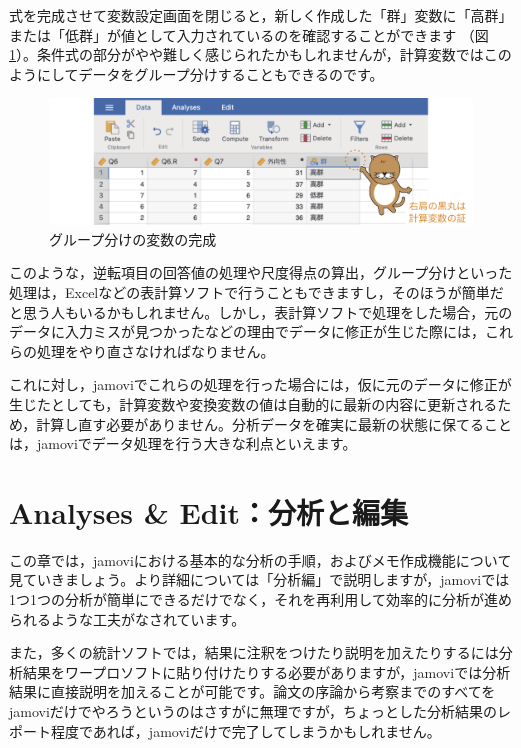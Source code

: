\documentclass[
  12pt,
  a5jpaper,
  lualatex, ja=standard]{bxjsbook}
\begin{document}
式を完成させて変数設定画面を閉じると，新しく作成した「群」変数に「高群」または「低群」が値として入力されているのを確認することができます
（図\ref{fig:basics-exercise-group-var}）。条件式の部分がやや難しく感じられたかもしれませんが，計算変数ではこのようにしてデータをグループ分けすることもできるのです。

\begin{figure}[!ht]

{\centering \includegraphics[width=1\linewidth]{images/basics/exercise-group-var} 

}

\caption{グループ分けの変数の完成}\label{fig:basics-exercise-group-var}
\end{figure}

このような，逆転項目の回答値の処理や尺度得点の算出，グループ分けといった処理は，Excelなどの表計算ソフトで行うこともできますし，そのほうが簡単だと思う人もいるかもしれません。しかし，表計算ソフトで処理をした場合，元のデータに入力ミスが見つかったなどの理由でデータに修正が生じた際には，これらの処理をやり直さなければなりません。

これに対し，jamoviでこれらの処理を行った場合には，仮に元のデータに修正が生じたとしても，計算変数や変換変数の値は自動的に最新の内容に更新されるため，計算し直す必要がありません。分析データを確実に最新の状態に保てることは，jamoviでデータ処理を行う大きな利点といえます。

\hypertarget{ch:basics-more}{%
\chapter{Analyses \& Edit：分析と編集}\label{ch:basics-more}}

この章では，jamoviにおける基本的な分析の手順，およびメモ作成機能について見ていきましょう。より詳細については「分析編」で説明しますが，jamoviでは1つ1つの分析が簡単にできるだけでなく，それを再利用して効率的に分析が進められるような工夫がなされています。

また，多くの統計ソフトでは，結果に注釈をつけたり説明を加えたりするには分析結果をワープロソフトに貼り付けたりする必要がありますが，jamoviでは分析結果に直接説明を加えることが可能です。論文の序論から考察までのすべてをjamoviだけでやろうというのはさすがに無理ですが，ちょっとした分析結果のレポート程度であれば，jamoviだけで完了してしまうかもしれません。
\end{document}
